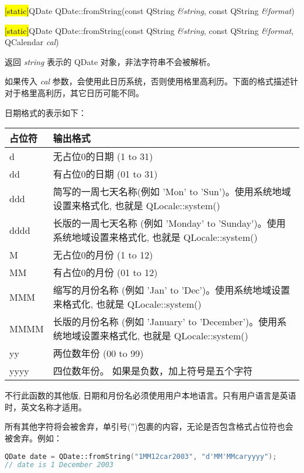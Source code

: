 \splitLine

\hl{[static]}QDate QDate::fromString(const QString \emph{\&string}, const QString \emph{\&format})

\hl{[static]}QDate QDate::fromString(const QString \emph{\&string}, const QString \emph{\&format}, QCalendar \emph{cal})

返回 \emph{string}  表示的 QDate 对象，非法字符串不会被解析。

如果传入 \emph{cal} 参数，会使用此日历系统，否则使用格里高利历。下面的格式描述针对于格里高利历，其它日历可能不同。

日期格式的表示如下：

\begin{tabular}{|l|l|}
\hline
占位符&	输出格式\\
\hline
d&	无占位0的日期 (1 to 31)\\
\hline
dd&	有占位0的日期 (01 to 31)\\
\hline
ddd&	简写的一周七天名称(例如 'Mon' to 'Sun')。使用系统地域设置来格式化, 也就是 QLocale::system()\\
\hline
dddd&	长版的一周七天名称 (例如 'Monday' to 'Sunday')。使用系统地域设置来格式化, 也就是 QLocale::system()\\
\hline
M&	无占位0的月份 (1 to 12)\\
\hline
MM&	有占位0的月份 (01 to 12)\\
\hline
MMM&	缩写的月份名称 (例如 'Jan' to 'Dec')。使用系统地域设置来格式化, 也就是 QLocale::system()\\
\hline
MMMM&	长版的月份名称 (例如 'January' to 'December')。使用系统地域设置来格式化, 也就是 QLocale::system()\\
\hline
yy&	两位数年份 (00 to 99)\\
\hline
yyyy&	四位数年份。 如果是负数，加上符号是五个字符\\
\hline
\end{tabular}

\begin{notice}
 不行此函数的其他版, 日期和月份名必须使用用户本地语言。只有用户语言是英语时，英文名称才适用。
\end{notice}

所有其他字符将会被舍弃，单引号('')包裹的内容，无论是否包含格式占位符也会被舍弃。例如：

\begin{lstlisting}[language=C++]
QDate date = QDate::fromString("1MM12car2003", "d'MM'MMcaryyyy");
// date is 1 December 2003
\end{lstlisting}

